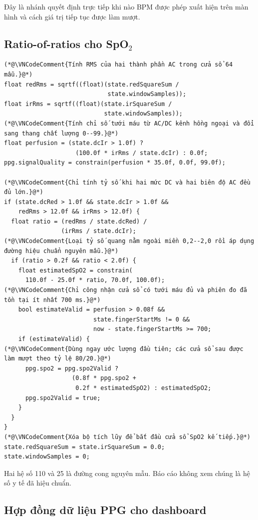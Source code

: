 \documentclass[12pt]{article}
\begin{document}
Đây là nhánh quyết định trực tiếp khi nào BPM được phép xuất hiện trên màn hình và cách giá trị tiếp tục được làm mượt.

\Needspace{0.40\textheight}
\subsection{\texorpdfstring{Ratio-of-ratios cho SpO$_2$}{Ratio-of-ratios cho SpO2}}
\begin{lstlisting}[style=firmware,caption={Đầy đủ điều kiện chất lượng và cập nhật SpO2 nguyên mẫu}]
(*@\VNCodeComment{Tính RMS của hai thành phần AC trong cửa sổ 64 mẫu.}@*)
float redRms = sqrtf((float)(state.redSquareSum /
                             state.windowSamples));
float irRms = sqrtf((float)(state.irSquareSum /
                            state.windowSamples));
(*@\VNCodeComment{Tính chỉ số tưới máu từ AC/DC kênh hồng ngoại và đổi sang thang chất lượng 0--99.}@*)
float perfusion = (state.dcIr > 1.0f) ?
                    (100.0f * irRms / state.dcIr) : 0.0f;
ppg.signalQuality = constrain(perfusion * 35.0f, 0.0f, 99.0f);

(*@\VNCodeComment{Chỉ tính tỷ số khi hai mức DC và hai biên độ AC đều đủ lớn.}@*)
if (state.dcRed > 1.0f && state.dcIr > 1.0f &&
    redRms > 12.0f && irRms > 12.0f) {
  float ratio = (redRms / state.dcRed) /
                (irRms / state.dcIr);
(*@\VNCodeComment{Loại tỷ số quang nằm ngoài miền 0,2--2,0 rồi áp dụng đường hiệu chuẩn nguyên mẫu.}@*)
  if (ratio > 0.2f && ratio < 2.0f) {
    float estimatedSpO2 = constrain(
      110.0f - 25.0f * ratio, 70.0f, 100.0f);
(*@\VNCodeComment{Chỉ công nhận cửa sổ có tưới máu đủ và phiên đo đã tồn tại ít nhất 700 ms.}@*)
    bool estimateValid = perfusion > 0.08f &&
                         state.fingerStartMs != 0 &&
                         now - state.fingerStartMs >= 700;
    if (estimateValid) {
(*@\VNCodeComment{Dùng ngay ước lượng đầu tiên; các cửa sổ sau được làm mượt theo tỷ lệ 80/20.}@*)
      ppg.spo2 = ppg.spo2Valid ?
                   (0.8f * ppg.spo2 +
                    0.2f * estimatedSpO2) : estimatedSpO2;
      ppg.spo2Valid = true;
    }
  }
}
(*@\VNCodeComment{Xóa bộ tích lũy để bắt đầu cửa sổ SpO2 kế tiếp.}@*)
state.redSquareSum = state.irSquareSum = 0.0;
state.windowSamples = 0;
\end{lstlisting}

Hai hệ số 110 và 25 là đường cong nguyên mẫu. Báo cáo không xem chúng là hệ số y tế đã hiệu chuẩn.

\subsection{Hợp đồng dữ liệu PPG cho dashboard}
\end{document}
